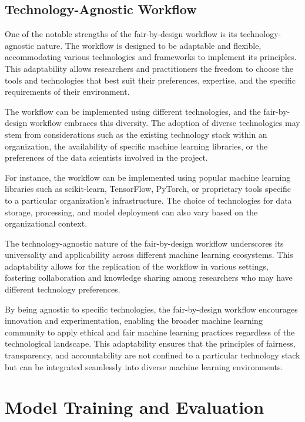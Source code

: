 \documentclass[12pt,a4paper,openright,twoside]{book}
\begin{document}
\subsection{Technology-Agnostic Workflow}

One of the notable strengths of the fair-by-design workflow is its technology-agnostic nature. The workflow is designed to be adaptable and flexible, accommodating various technologies and frameworks to implement its principles. This adaptability allows researchers and practitioners the freedom to choose the tools and technologies that best suit their preferences, expertise, and the specific requirements of their environment.

The workflow can be implemented using different technologies, and the fair-by-design workflow embraces this diversity. The adoption of diverse technologies may stem from considerations such as the existing technology stack within an organization, the availability of specific machine learning libraries, or the preferences of the data scientists involved in the project.

For instance, the workflow can be implemented using popular machine learning libraries such as scikit-learn, TensorFlow, PyTorch, or proprietary tools specific to a particular organization's infrastructure. The choice of technologies for data storage, processing, and model deployment can also vary based on the organizational context.

The technology-agnostic nature of the fair-by-design workflow underscores its universality and applicability across different machine learning ecosystems. This adaptability allows for the replication of the workflow in various settings, fostering collaboration and knowledge sharing among researchers who may have different technology preferences.

By being agnostic to specific technologies, the fair-by-design workflow encourages innovation and experimentation, enabling the broader machine learning community to apply ethical and fair machine learning practices regardless of the technological landscape. This adaptability ensures that the principles of fairness, transparency, and accountability are not confined to a particular technology stack but can be integrated seamlessly into diverse machine learning environments.

\section{Model Training and Evaluation}
\end{document}
